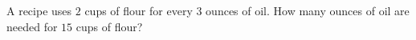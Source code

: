 A recipe uses $2$ cups of flour for every $3$ ounces of oil. How many ounces of oil are needed for $15$ cups of flour?
